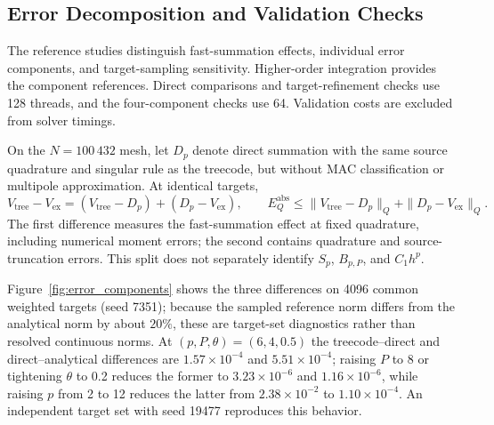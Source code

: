 \documentclass[a4paper,pdflatex,sn-mathphys-num]{sn-jnl}
\theoremstyle{thmstyleone}
\begin{document}
\subsection{Error Decomposition and Validation Checks}
\label{app:error_checks}

The reference studies distinguish fast-summation effects, individual error components, and target-sampling sensitivity. Higher-order integration provides the component references. Direct comparisons and target-refinement checks use 128 threads, and the four-component checks use 64. Validation costs are excluded from solver timings.

On the $N=100\,432$ mesh, let $D_p$ denote direct summation with the same source quadrature and singular rule as the treecode, but without MAC classification or multipole approximation. At identical targets,
\[
V_{\mathrm{tree}}-V_{\mathrm{ex}}
=(V_{\mathrm{tree}}-D_p)+(D_p-V_{\mathrm{ex}}),\qquad
E_Q^{\mathrm{abs}}\leq
\|V_{\mathrm{tree}}-D_p\|_Q+\|D_p-V_{\mathrm{ex}}\|_Q.
\]
The first difference measures the fast-summation effect at fixed quadrature, including numerical moment errors; the second contains quadrature and source-truncation errors. This split does not separately identify $S_p$, $B_{p,P}$, and $C_1h^p$.

Figure~\ref{fig:error_components} shows the three differences on 4096 common weighted targets (seed 7351); because the sampled reference norm differs from the analytical norm by about $20\%$, these are target-set diagnostics rather than resolved continuous norms. At $(p,P,\theta)=(6,4,0.5)$ the treecode--direct and direct--analytical differences are $1.57\times10^{-4}$ and $5.51\times10^{-4}$; raising $P$ to 8 or tightening $\theta$ to 0.2 reduces the former to $3.23\times10^{-6}$ and $1.16\times10^{-6}$, while raising $p$ from 2 to 12 reduces the latter from $2.38\times10^{-2}$ to $1.10\times10^{-4}$. An independent target set with seed 19477 reproduces this behavior.
\end{document}
